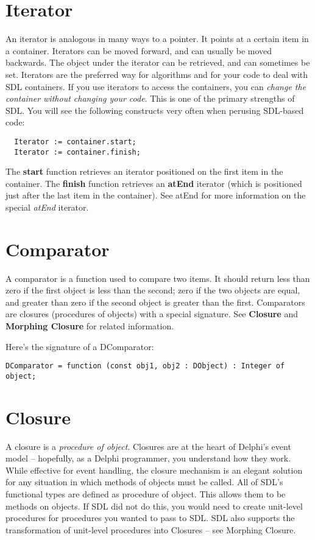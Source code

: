 \documentclass{report}
\begin{document}
\section{Iterator}

An iterator is analogous in many ways to a pointer. It points at a certain
item in a container. Iterators can be moved forward, and can usually be
moved backwards. The object under the iterator can be retrieved, and can
sometimes be set. Iterators are the preferred way for algorithms and for
your code to deal with SDL containers. If you use iterators to access the
containers, you can \emph{change the container without changing your code}. This is one of the
primary strengths of SDL. You will see the following constructs very often
when perusing SDL-based code:

\begin{lstlisting}
  Iterator := container.start;
  Iterator := container.finish;
\end{lstlisting}

The \textbf{start} function retrieves an iterator positioned on the first
item in the container. The \textbf{finish} function retrieves an
\textbf{atEnd} iterator (which is positioned just after the last item in the
container). See atEnd for more information on the special \emph{atEnd} iterator.

\section{Comparator}

A comparator is a function used to compare two items.  It should return less
than zero if the first object is less than the second; zero if the two
objects are equal, and greater than zero if the second object is greater
than the first. Comparators are closures (procedures of objects) with a
special signature. See \textbf{Closure} and \textbf{Morphing Closure} for
related information.

Here's the signature of a DComparator:

\begin{lstlisting}
DComparator = function (const obj1, obj2 : DObject) : Integer of object;
\end{lstlisting}

\section{Closure}

A closure is a \emph{procedure of object}. Closures are at the heart of Delphi's
event model -- hopefully, as a Delphi programmer, you understand how they
work. While effective for event handling, the closure mechanism is an
elegant solution for any situation in which methods of objects must be
called. All of SDL's functional types are defined as procedure of object.
This allows them to be methods on objects. If SDL did not do this, you would
need to create unit-level procedures for procedures you wanted to pass to
SDL. SDL also supports the transformation of unit-level procedures into
Closures -- see Morphing Closure.
\end{document}

